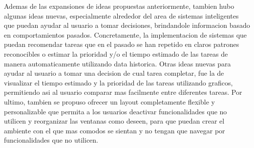 Ademas de las expansiones de ideas propuestas anteriormente, tambien hubo algunas ideas nuevas, especialmente alrededor del area de sistemas inteligentes que puedan ayudar al usuario a tomar decisiones, brindandole informacion basado en comportamientos pasados. Concretamente, la implementacion de sistemas que puedan recomendar tareas que en el pasado se han repetido en claros patrones reconocibles o estimar la prioridad y/o el tiempo estimado de las tareas de manera automaticamente utilizando data historica. Otras ideas nuevas para ayudar al usuario a tomar una decision de cual tarea completar, fue la de visualizar el tiempo estimado y la prioridad de las tareas utilizando graficos, permitiendo asi al usuario comparar mas facilmente entre diferentes tareas. Por ultimo, tambien se propuso ofrecer un layout completamente flexible y personalizable que permita a los usuarios deactivar funcionalidades que no utilicen y reorganizar las ventanas como deseen, para que puedan crear el ambiente con el que mas comodos se sientan y no tengan que navegar por funcionalidades que no utilicen.


